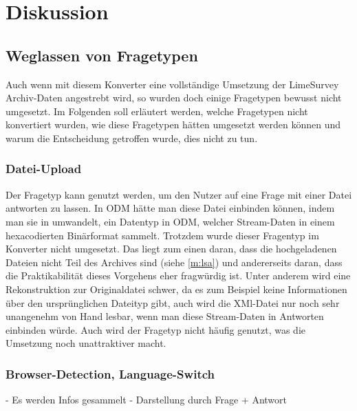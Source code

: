 \chapter{Diskussion}
\label{ch:diskussion}



\section{Weglassen von Fragetypen}

Auch wenn mit diesem Konverter eine vollständige Umsetzung der LimeSurvey Archiv-Daten angestrebt wird, so wurden doch einige Fragetypen bewusst nicht umgesetzt.
Im Folgenden soll erläutert werden, welche Fragetypen nicht konvertiert wurden, wie diese Fragetypen hätten umgesetzt werden können und warum die Entscheidung getroffen wurde, dies nicht zu tun.

\subsection{Datei-Upload}

Der Fragetyp  kann genutzt werden, um den Nutzer auf eine Frage mit einer Datei antworten zu lassen.
In ODM hätte man diese Datei einbinden können, indem man sie in  umwandelt, ein Datentyp in ODM, welcher Stream-Daten in einem hexacodierten Binärformat sammelt.
Trotzdem wurde dieser Fragentyp im Konverter nicht umgesetzt.
Das liegt zum einen daran, dass die hochgeladenen Dateien nicht Teil des Archives sind (siehe \cref{m:lsa}) und andererseits daran, dass die Praktikabilität dieses Vorgehens eher fragwürdig ist.
Unter anderem wird eine Rekonstruktion zur Originaldatei schwer, da es zum Beispiel keine Informationen über den ursprünglichen Dateityp gibt, auch wird die XMl-Datei nur noch sehr unangenehm von Hand lesbar, wenn man diese Stream-Daten in Antworten einbinden würde. 
Auch wird der Fragetyp nicht häufig genutzt, was die Umsetzung noch unattraktiver macht.

\subsection{Browser-Detection, Language-Switch}

- Es werden Infos gesammelt
- Darstellung durch Frage + Antwort

